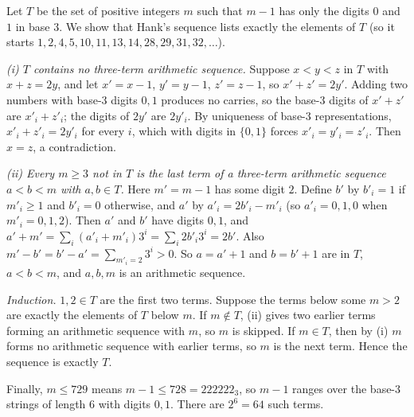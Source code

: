 Let $T$ be the set of positive integers $m$ such that $m-1$ has only the digits $0$ and $1$ in base $3$. We show that Hank's sequence lists exactly the elements of $T$ (so it starts $1,2,4,5,10,11,13,14,28,29,31,32,\dots$).

\emph{(i) $T$ contains no three-term arithmetic sequence.} Suppose $x<y<z$ in $T$ with $x+z=2y$, and let $x'=x-1$, $y'=y-1$, $z'=z-1$, so $x'+z'=2y'$. Adding two numbers with base-$3$ digits $0,1$ produces no carries, so the base-$3$ digits of $x'+z'$ are $x'_i+z'_i$; the digits of $2y'$ are $2y'_i$. By uniqueness of base-$3$ representations, $x'_i+z'_i=2y'_i$ for every $i$, which with digits in $\{0,1\}$ forces $x'_i=y'_i=z'_i$. Then $x=z$, a contradiction.

\emph{(ii) Every $m\ge3$ not in $T$ is the last term of a three-term arithmetic sequence $a<b<m$ with $a,b\in T$.} Here $m'=m-1$ has some digit $2$. Define $b'$ by $b'_i=1$ if $m'_i\ge1$ and $b'_i=0$ otherwise, and $a'$ by $a'_i=2b'_i-m'_i$ (so $a'_i=0,1,0$ when $m'_i=0,1,2$). Then $a'$ and $b'$ have digits $0,1$, and $a'+m'=\sum_i\left(a'_i+m'_i\right)3^i=\sum_i2b'_i3^i=2b'$. Also $m'-b'=b'-a'=\sum_{m'_i=2}3^i>0$. So $a=a'+1$ and $b=b'+1$ are in $T$, $a<b<m$, and $a,b,m$ is an arithmetic sequence.

\emph{Induction.} $1,2\in T$ are the first two terms. Suppose the terms below some $m>2$ are exactly the elements of $T$ below $m$. If $m\notin T$, (ii) gives two earlier terms forming an arithmetic sequence with $m$, so $m$ is skipped. If $m\in T$, then by (i) $m$ forms no arithmetic sequence with earlier terms, so $m$ is the next term. Hence the sequence is exactly $T$.

Finally, $m\le729$ means $m-1\le728=222222_3$, so $m-1$ ranges over the base-$3$ strings of length $6$ with digits $0,1$. There are $2^6=\boxed{64}$ such terms.
